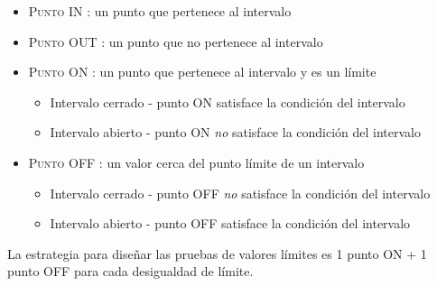 \begin{itemize}
   \item \textsc{Punto IN} : un punto que pertenece al intervalo
   \item \textsc{Punto OUT} : un punto que no pertenece al intervalo
   \item \textsc{Punto ON} : un punto que pertenece al intervalo y es un límite
   \begin{itemize}
      \item Intervalo cerrado - punto ON satisface la
      condición del intervalo
      \item Intervalo abierto - punto ON \textit{no} satisface la
      condición del intervalo
   \end{itemize}
   \item \textsc{Punto OFF} : un valor cerca del punto límite de un intervalo
   \begin{itemize}
      \item Intervalo cerrado - punto OFF \textit{no} satisface la
      condición del intervalo
      \item Intervalo abierto - punto OFF satisface la
      condición del intervalo
   \end{itemize}
\end{itemize}

La estrategia para diseñar las pruebas de valores límites es 1 punto ON + 1 punto OFF para cada desigualdad de límite.

